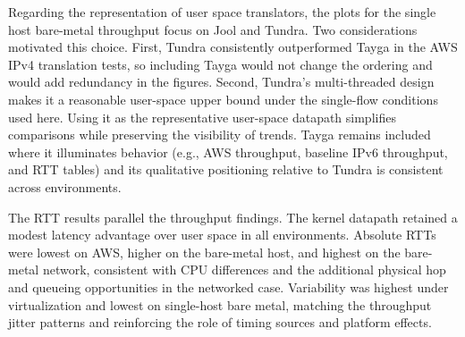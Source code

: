 Regarding the representation of user space translators, the plots for the single host bare-metal throughput focus on Jool and Tundra. Two considerations motivated this choice. First, Tundra consistently outperformed Tayga in the AWS IPv4 translation tests, so including Tayga would not change the ordering and would add redundancy in the figures. Second, Tundra’s multi-threaded design makes it a reasonable user-space upper bound under the single-flow conditions used here. Using it as the representative user-space datapath simplifies comparisons while preserving the visibility of trends. Tayga remains included where it illuminates behavior (e.g., AWS throughput, baseline IPv6 throughput, and RTT tables) and its qualitative positioning relative to Tundra is consistent across environments.

The RTT results parallel the throughput findings. The kernel datapath retained a modest latency advantage over user space in all environments. Absolute RTTs were lowest on AWS, higher on the bare-metal host, and highest on the bare-metal network, consistent with CPU differences and the additional physical hop and queueing opportunities in the networked case. Variability was highest under virtualization and lowest on single-host bare metal, matching the throughput jitter patterns and reinforcing the role of timing sources and platform effects.
